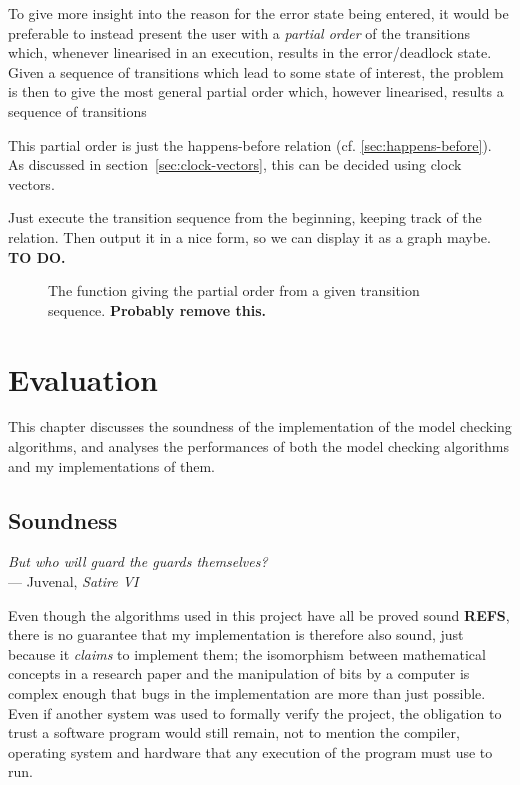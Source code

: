 \documentclass[12pt,a4paper,twoside,openright]{report}
\begin{document}
To give more insight into the reason for the
error state being entered, it would be preferable
to instead present the user with a
\emph{partial order} of the transitions which,
whenever linearised in an execution,
results in the error/deadlock state.
Given a sequence of transitions which lead to
some state of interest, the problem is
then to give the most general partial order
which, however linearised, results a sequence
of transitions 

This partial order is just the happens-before
relation (cf. \ref{sec:happens-before}). As
discussed in section~\ref{sec:clock-vectors},
this can be decided using clock vectors.

Just execute the transition sequence
from the beginning, keeping track of the relation.
Then output it in a nice form, so we can display it
as a graph maybe. \textbf{TO DO.}

\begin{figure}	
	
	\caption{The function giving the partial order from
		a given transition sequence. \textbf{Probably remove this.}}
\end{figure}

\chapter{Evaluation}
\label{cha:evaluation}

This chapter discusses the soundness
of the implementation of the model checking
algorithms, and analyses the performances
of both the model checking algorithms and
my implementations of them.

\section{Soundness}

\begin{center}
	\textit{But who will guard the guards themselves?} \\
	\qquad\qquad\qquad --- Juvenal, \textit{Satire VI}
\end{center}

Even though the algorithms
used in this project have all be proved sound \textbf{REFS},
there is no guarantee that my implementation
is therefore also sound, just because it
\emph{claims} to implement them; the isomorphism
between mathematical concepts in a research paper
and the manipulation of bits by a computer
is complex enough that bugs in the
implementation are more than just possible.
Even if another system was used to formally verify
the project, the obligation to trust
a software program would still remain,
not to mention the compiler, operating
system and hardware that any execution
of the program must use to run.
\end{document}
